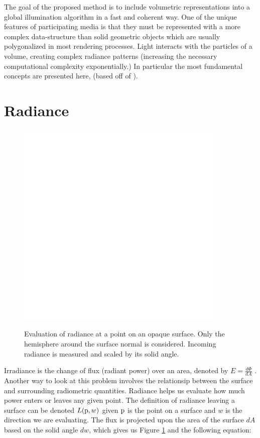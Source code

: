 \documentclass[12pt]{ucthesis}
\newcommand{\captionfonts}{\small\bf\ssp}
\begin{document}
The goal of the proposed method is to include volumetric representations into a global illumination algorithm in a fast and coherent way. One of the unique features of participating media is that they must be represented with a more complex data-structure than solid geometric objects which are usually polygonalized in most rendering processes.  Light interacts with the particles of a volume, creating complex radiance patterns (increasing the necessary computational complexity exponentially.) In particular the most fundamental concepts are presented here,  (based off of  \cite{pbrt}).



\section{Radiance}

\begin{figure}[h!]
    \centering
    \includegraphics[width=100mm]{img/diag/radiance.pdf}
    \captionfonts
    \caption{Evaluation of radiance at a point on an opaque surface.  Only the hemisphere around the surface normal is considered.  Incoming radiance is measured and scaled by its solid angle.}
    \label{fig:radiance}
\end{figure}

Irradiance is the change of flux (radiant power) over an area, denoted by $E = \frac{d\Phi}{dA}$ \cite{aga}. Another way to look at this problem involves the relationsip between the surface and surrounding radiometric quantities.  Radiance helps us evaluate how much power enters or leaves any given point.  The definition of radiance leaving a surface can be denoted $L(\textup{p}, w)$ given $\textup{p}$ is the point on a surface and $w$ is the direction we are evaluating.  The flux is projected upon the area of the surface $dA$ based on the solid angle $dw$, which gives us Figure \ref{fig:radiance} and the following equation:
\end{document}
